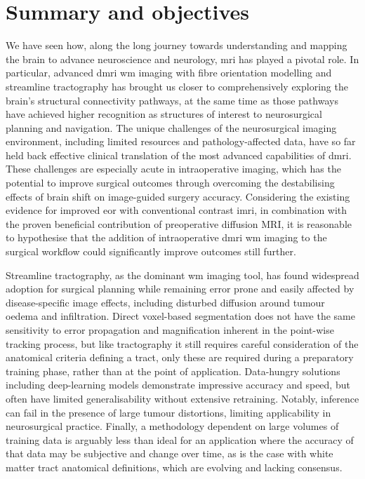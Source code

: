 \section{Summary and objectives}
\label{sec:problem}

We have seen how, along the long journey towards understanding and mapping the brain to advance neuroscience and neurology, \gls{mri} has played a pivotal role.
In particular, advanced \gls{dmri} \gls{wm} imaging with fibre orientation modelling and streamline tractography has brought us closer to comprehensively exploring the brain's structural connectivity pathways, at the same time as those pathways have achieved higher recognition as structures of interest to neurosurgical planning and navigation.
The unique challenges of the neurosurgical imaging environment, including limited resources and pathology-affected data, have so far held back effective clinical translation of the most advanced capabilities of \gls{dmri}.
These challenges are especially acute in intraoperative imaging, which has the potential to improve surgical outcomes through overcoming the destabilising effects of brain shift on image-guided surgery accuracy.
Considering the existing evidence for improved \gls{eor} with conventional contrast \gls{imri}, in combination with the proven beneficial contribution of preoperative diffusion MRI, it is reasonable to hypothesise that the addition of intraoperative \gls{dmri} \gls{wm} imaging to the surgical workflow could significantly improve outcomes still further.

Streamline tractography, as the dominant \gls{wm} imaging tool, has found widespread adoption for surgical planning while remaining error prone and easily affected by disease-specific image effects, including disturbed diffusion around tumour oedema and infiltration.
Direct voxel-based segmentation does not have the same sensitivity to error propagation and magnification inherent in the point-wise tracking process, but like tractography it still requires careful consideration of the anatomical criteria defining a tract, only these are required during a preparatory training phase, rather than at the point of application.
Data-hungry solutions including deep-learning models demonstrate impressive accuracy and speed, but often have limited generalisability without extensive retraining.
Notably, inference can fail in the presence of large tumour distortions, limiting applicability in neurosurgical practice.
Finally, a methodology dependent on large volumes of training data is arguably less than ideal for an application where the accuracy of that data may be subjective and change over time, as is the case with white matter tract anatomical definitions, which are evolving and lacking consensus.


